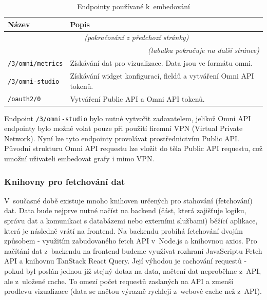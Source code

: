 \documentclass[czech, bc, kiv, he, iso690numb, viewonly]{fasthesis} %
\begin{document}
	\begin{longtable}{p{}p{}}
	\caption{Endpointy používané k~embedování}
	\label{tab:embeddingEndpoints}\\
	\toprule[1.5pt]
	\textbf{Název} & \textbf{Popis}\\
	\midrule
	\endfirsthead
	\multicolumn{2}{c}{\tablename{}~\thetable{} \textit{(pokračování z předchozí stránky)}}\\
	\endhead
	\midrule
	\multicolumn{2}{r}{\textit{(tabulka pokračuje na další stránce)}}\\
	\endfoot
	\bottomrule[1.5pt]
	\endlastfoot
	\verb"/3/omni/metrics" & Získávání dat pro vizualizace. Data jsou ve formátu omni. \\
	\midrule
	\verb"/3/omni-studio" &  Získávání widget konfigurací, fieldů a vytváření Omni API tokenů.\\
	\midrule
	\verb"/oauth2/0" &  Vytváření Public API a Omni API tokenů. \\
	\end{longtable}

Endpoint \texttt{/3/omni-studio} bylo nutné vytvořit zadavatelem, jelikož Omni API endpointy bylo možné volat pouze při použití firemní VPN (Virtual Private Network). Nyní lze tyto endpointy provolávat prostřednictvím Public API. Původní
strukturu Omni API requestu lze vložit do těla Public API requestu, což umožní uživateli embedovat grafy i mimo VPN.

\subsubsection{Knihovny pro fetchování dat}

V~současné době existuje mnoho knihoven určených pro stahování (fetchování) dat. Data bude nejprve nutné načíst na backend (část, která zajišťuje logiku, správu dat a komunikaci s databázemi nebo externími službami) běžící aplikace, která je následně vrátí na frontend. Na backendu probíhá fetchování dvojím způsobem - 
využitím zabudovaného fetch API v~Node.js a knihovnou axios. Pro načítání dat z~backendu na frontend budeme využívat rozhraní JavaScriptu Fetch API a knihovnu TanStack React Query. Její výhodou je cachování
requestů \cite{tanstackQueryDocs} - pokud byl poslán jednou již stejný dotaz na data, načtení dat neproběhne z~API, ale z~uložené cache. To omezí počet requestů zaslaných na API a zmenší prodlevu vizualizace (data se načtou výrazně rychleji z~webové cache než z~API). 
\end{document}
